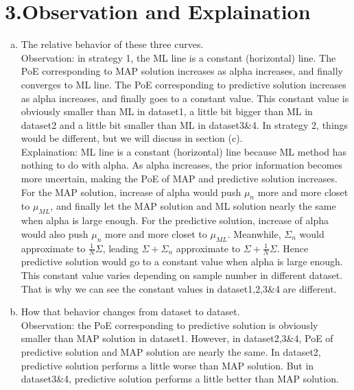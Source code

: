 \documentclass[12pt,letterpaper]{article}
\begin{document}
    \section*{3.Observation and Explaination}
    \begin{enumerate}[a)]
        \item 
        The relative behavior of these three curves.\\
        Observation: in strategy 1, the ML line is a constant (horizontal) line.
        The PoE corresponding to MAP solution increases as alpha increases, and finally
        converges to ML line. The PoE corresponding to predictive solution increases as alpha increases,
        and finally goes to a constant value. This constant value is obviously smaller than ML in
        dataset1, a little bit bigger than ML in dataset2 and a little bit smaller than ML in dataset3\&4.
        In strategy 2, things would be different, but we will discuss in section (c).\\

        Explaination: ML line is a constant (horizontal) line because ML method has nothing to do with
        alpha. As alpha increases, the prior information becomes more uncertain, making the PoE of MAP
        and predictive solution increases. For the MAP solution, increase of alpha would push $\mu_n$ more
        and more closet to $\mu_{ML}$, and finally let the MAP solution and ML solution nearly the same when
        alpha is large enough. For the predictive solution, increase of alpha would also push $\mu_n$ more
        and more closet to $\mu_{ML}$. Meanwhile, $\Sigma_n$ would approximate to $\frac{1}{N}\Sigma$, leading
        $\Sigma+\Sigma_n$ approximate to $\Sigma+\frac{1}{N}\Sigma$. Hence predictive solution would go
        to a constant value when alpha is large enough. This constant value varies depending on sample number
        in different dataset. That is why we can see the constant values in dataset1,2,3\&4 are different.
        \item 
        How that behavior changes from dataset to dataset.\\
        Observation: the PoE corresponding to predictive solution is obviously smaller than MAP solution in
        dataset1. However, in dataset2,3\&4, PoE of predictive solution and MAP solution are nearly the same.
        In dataset2, predictive solution performs a little worse than MAP solution. But in dataset3\&4, 
        predictive solution performs a little better than MAP solution.


\end{enumerate}
\end{document}
